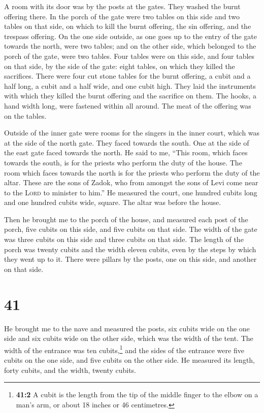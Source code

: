  A room with its door was by the posts at the gates. They
washed the burnt offering there.  In the porch of the
gate were two tables on this side and two tables on that side, on which
to kill the burnt offering, the sin offering, and the trespass offering.
 On the one side outside, as one goes up to the entry of
the gate towards the north, were two tables; and on the other side,
which belonged to the porch of the gate, were two tables.
 Four tables were on this side, and four tables on that
side, by the side of the gate: eight tables, on which they killed the
sacrifices.  There were four cut stone tables for the
burnt offering, a cubit and a half long, a cubit and a half wide, and
one cubit high. They laid the instruments with which they killed the
burnt offering and the sacrifice on them.  The hooks, a
hand width long, were fastened within all around. The meat of the
offering was on the tables.

 Outside of the inner gate were rooms for the singers in
the inner court, which was at the side of the north gate. They faced
towards the south. One at the side of the east gate faced towards the
north.  He said to me, ``This room, which faces towards
the south, is for the priests who perform the duty of the house.
 The room which faces towards the north is for the
priests who perform the duty of the altar. These are the sons of Zadok,
who from amongst the sons of Levi come near to the \textsc{Lord} to
minister to him.''  He measured the court, one hundred
cubits long and one hundred cubits wide, square. The altar was before
the house.

 Then he brought me to the porch of the house, and
measured each post of the porch, five cubits on this side, and five
cubits on that side. The width of the gate was three cubits on this side
and three cubits on that side.  The length of the porch
was twenty cubits and the width eleven cubits, even by the steps by
which they went up to it. There were pillars by the posts, one on this
side, and another on that side.

\hypertarget{section-40}{%
\section{41}\label{section-40}}

 He brought me to the nave and measured the posts, six
cubits wide on the one side and six cubits wide on the other side, which
was the width of the tent.  The width of the entrance was
ten cubits,\footnote{\textbf{41:2} A cubit is the length from the tip of
  the middle finger to the elbow on a man's arm, or about 18 inches or
  46 centimetres.} and the sides of the entrance were five cubits on the
one side, and five cubits on the other side. He measured its length,
forty cubits, and the width, twenty cubits.


